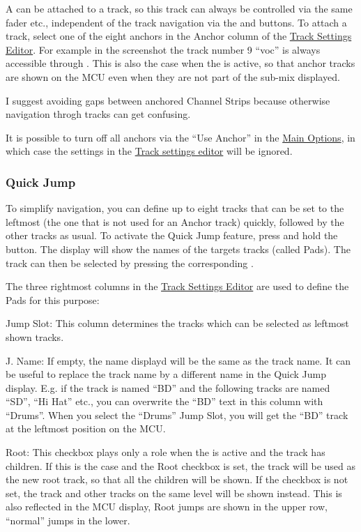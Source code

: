 A \cs can be attached to a track, so this track can always be
controlled via the same fader etc., independent of the track
navigation via the \bankdu and \channeldu buttons. To attach a track,
select one of the eight anchors in the Anchor column of the
\hyperref[F:Screenshot_Track_Mode]{Track Settings Editor}. For example
in the screenshot the track number 9 ``voc'' is always accessible through
. This is also the case when the \foldermode is active, so that
anchor tracks are shown on the MCU even when they are not part of the 
sub-mix displayed.

I suggest avoiding gaps between anchored Channel Strips because otherwise navigation
throgh tracks can get confusing.

It is possible to turn off all anchors via the ``Use Anchor''
\attribute in the \hyperref[T:multitrack_options1]{Main Options}, in
which case the settings in the
\hyperref[F:Screenshot_Track_Mode]{Track settings editor} will be
ignored.

\subsubsection{Quick Jump}\label{quickjump}

To simplify navigation, you can define up to eight tracks that can be
set to the leftmost \cs (the one that is not used for an Anchor track)
quickly, followed by the other tracks as usual. To activate the Quick
Jump feature, press and hold the \pan button. The display will show
the names of the targets tracks (called Pads). The track can then be
selected by pressing the corresponding \vpot.

The three rightmost columns in the
\hyperref[F:Screenshot_Track_Mode]{Track Settings Editor} are used to define the
Pads for this purpose:

\begin{compactitem}
\item Jump Slot: This column determines the tracks which can be
  selected as leftmost shown tracks.
\item J. Name: If empty, the name displayd will be the same as the
  track name. It can be useful to replace the track name by a
  different name in the Quick Jump display.  E.g. if the track is
  named ``BD'' and the following tracks are named ``SD'', ``Hi Hat''
  etc., you can overwrite the ``BD'' text in this column with
  ``Drums''. When you select the ``Drums'' Jump Slot, you will get the
  ``BD'' track at the leftmost position on the MCU. 
\item Root: This checkbox plays only a role when the \foldermode is
  active and the track has children. If this is the case and the Root
  checkbox is set, the track will be used as the new root track, so
  that all the children will be shown. If the checkbox is not set, the
  track and other tracks on the same level will be shown instead. This
  is also reflected in the MCU display, Root jumps are shown in the
  upper row, ``normal'' jumps in the lower.
\end{compactitem}

